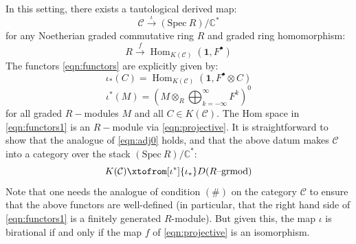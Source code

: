 \documentclass[12pt]{amsart}
\numberwithin{equation}{section}
\theoremstyle{definition}
\theoremstyle{remark}
\DeclareMathOperator{\Hom}{Hom}
\newcommand{\CC}{\mathbb{C}}
\newcommand{\cat}{\mathcal{C}}
\renewcommand{\1}{\mathbf{1}}
\newcommand{\spec}{\mathrm{Spec}}
\begin{document}
In this setting, there exists a tautological derived map:
\begin{equation}
\label{eqn:projective0}
\cat \stackrel{\iota}\longrightarrow (\spec \ R )/\CC^*
\end{equation}
for any Noetherian graded commutative ring $R$ and graded ring homomorphism: 
\begin{equation}
\label{eqn:projective}
R \stackrel{f}\longrightarrow  \Hom_{K(\cat)}(\1,F^{\bullet})
\end{equation}
The functors \eqref{eqn:functors} are explicitly given by:
\begin{equation}
\label{eqn:functors1}
\iota_*(C) = \Hom_{K(\cat)} \left(\1, F^{\bullet} \otimes C \right)
\end{equation}
\begin{equation}
\label{eqn:functors2}
{\iota}^*(M) = \left( M \otimes_R \bigoplus_{k=-\infty}^{\infty} F^k \right)^0
\end{equation}
for all graded $R-$modules $M$ and all $C \in K(\cat)$. The Hom space in \eqref{eqn:functors1} is an $R-$module via \eqref{eqn:projective}. It is straightforward to show that the analogue of \eqref{eqn:adj0} holds, and that the above datum makes $\cat$ into a category over the stack $(\spec \ R )/\CC^*$:
\begin{equation}
\label{eqn:yoy}
K(\cat) \xtofrom[\iota^*]{\iota_*}D(R\text{--grmod})
\end{equation}
Note that one needs the analogue of condition $(\#)$  on the category $\cat$ to ensure that the above functors are well-defined (in particular, that the right hand side of \eqref{eqn:functors1} is a finitely generated $R$-module). But given this, the map $\iota$ is birational if and only if the map $f$ of \eqref{eqn:projective} is an isomorphism. %

\end{document}
